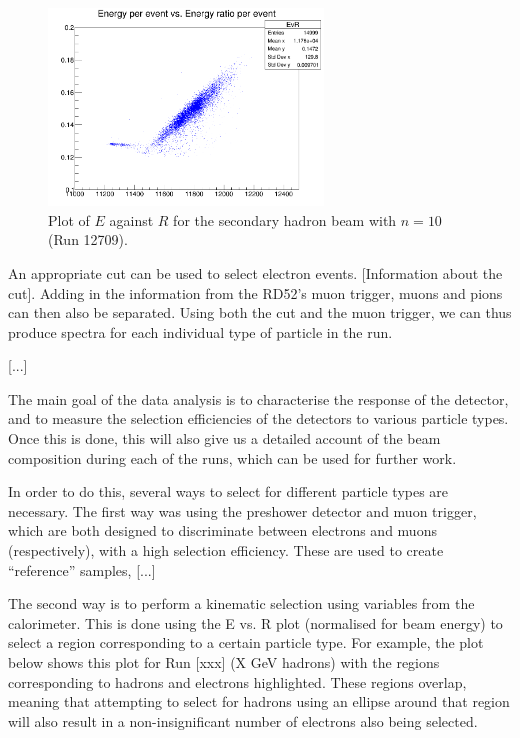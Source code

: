 \begin{figure}[h]
	\centering
	\includegraphics[width=0.65\textwidth]{../Pictures/12709-EvR.png}
	\caption{Plot of $E$ against $R$ for the secondary hadron beam with $n = 10$ (Run 12709).}
	\label{figure:testbeam/results/EvR}
\end{figure}

An appropriate cut can be used to select electron events. [Information about the cut]. Adding in the information from the RD52's muon trigger, muons and pions can then also be separated. Using both the cut and the muon trigger, we can thus produce spectra for each individual type of particle in the run.

[...]

The main goal of the data analysis is to characterise the response of the detector, and to measure the selection efficiencies of the detectors to various particle types. Once this is done, this will also give us a detailed account of the beam composition during each of the runs, which can be used for further work.

In order to do this, several ways to select for different particle types are necessary. The first way was using the preshower detector and muon trigger, which are both designed to discriminate between electrons and muons (respectively), with a high selection efficiency. These are used to create ``reference'' samples, [...]

The second way is to perform a kinematic selection using variables from the calorimeter. This is done using the E vs. R plot (normalised for beam energy) to select a region corresponding to a certain particle type. For example, the plot below shows this plot for Run [xxx] (X GeV hadrons) with the regions corresponding to hadrons and electrons highlighted. These regions overlap, meaning that attempting to select for hadrons using an ellipse around that region will also result in a non-insignificant number of electrons also being selected.

